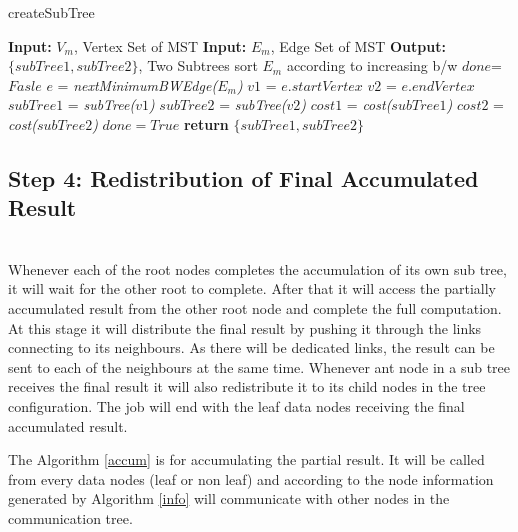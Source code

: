 \documentclass[12pt,notitlepage,oneside]{report}
\begin{document}
\begin{algorithm} [!htbp]
	\caption{createSubTree}
	\begin{algorithmic}[1]
	\label{algo6}
		\STATE \textbf{Input: }$V_m$, Vertex Set of MST
		\STATE \textbf{Input:}	$E_m$, Edge Set of MST
		\STATE \textbf{Output: }$\{subTree1, subTree2\}$, Two Subtrees
		\STATE sort $E_m$ according to increasing b/w
		\STATE $done$=$Fasle$
			\STATE $e$ = \textit{nextMinimumBWEdge($E_m$)}
			\STATE $v1$ = $e.startVertex$
			\STATE $v2$ = $e.endVertex$
			\STATE $subTree1$ = \textit{subTree($v1$)}
			\STATE $subTree2$ = \textit{subTree($v2$)}
			\STATE $cost1$ = \textit{cost($subTree1$)}
			\STATE $cost2$ = \textit{cost($subTree2$)}
				\STATE $done = True$
			\ENDIF
		\ENDWHILE	
		\STATE \textbf{return} $\{subTree1, subTree2\}$
	\end{algorithmic}
\end{algorithm}


\subsection{\textbf{Step 4: Redistribution of Final Accumulated Result}}\hspace*{\fill} \\
Whenever each of the root nodes completes the accumulation of its own sub tree, it will wait for the other root to complete. After that it will access the partially accumulated result from the other root node and complete the full computation. At this stage it will distribute the final result by pushing it through the links connecting to its neighbours. As there will be dedicated links, the result can be sent to each of the neighbours at the same time. Whenever ant node in a sub tree receives the final result it will also redistribute it to its child nodes in the tree configuration. The job will end with the leaf data nodes receiving the final accumulated result.

The Algorithm \ref{accum} is for accumulating the partial result. It will be called from every data nodes (leaf or non leaf) and according to the node information generated by Algorithm \ref{info} will communicate with other nodes in the communication tree.
\end{document}
